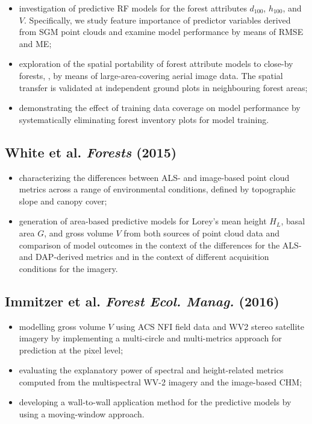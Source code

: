  \begin{itemize}
 	\item investigation of predictive \ac{RF} models for the forest attributes $d_{100}$, $h_{100}$, and $V$. 
	 	Specifically, we study feature importance of predictor variables derived from \ac{SGM} point clouds and examine
	 	model performance by means of \ac{RMSE} and \ac{ME};   
 	
 	\item exploration of the spatial portability of forest attribute models to close-by forests, \ie, by means of large-area-covering aerial image data.
	 	The spatial transfer is validated at independent ground plots in neighbouring forest areas;	
 	
 	\item demonstrating the effect of training data coverage on model performance by systematically eliminating forest inventory plots for model training.
 \end{itemize}


\subsection*{White et al. \emph{Forests} (2015)}		

\begin{itemize}
	\item characterizing the differences between \ac{ALS}- and image-based point cloud metrics across a range of environmental conditions,
		defined by topographic slope and canopy cover;
	
	\item generation of area-based predictive models for Lorey's mean height $H_L$, basal area $G$, and gross volume $V$ from both sources
		of point cloud data and comparison of model outcomes in the context of the differences for the \ac{ALS}- and \ac{DAP}-derived metrics
		and in the context of different acquisition conditions for the imagery. 
\end{itemize}


\subsection*{Immitzer et al. \emph{Forest Ecol. Manag.} (2016)}

\begin{itemize}
	\item modelling gross volume $V$ using \ac{ACS} \ac{NFI} field data and \ac{WV2} stereo satellite imagery by implementing
		a multi-circle and multi-metrics approach for prediction at the pixel level;
	
	\item evaluating the explanatory power of spectral and height-related metrics computed from the multispectral WV-2 imagery and the image-based \ac{CHM};
	
	\item developing a wall-to-wall application method for the predictive models by using a moving-window approach.
\end{itemize}


